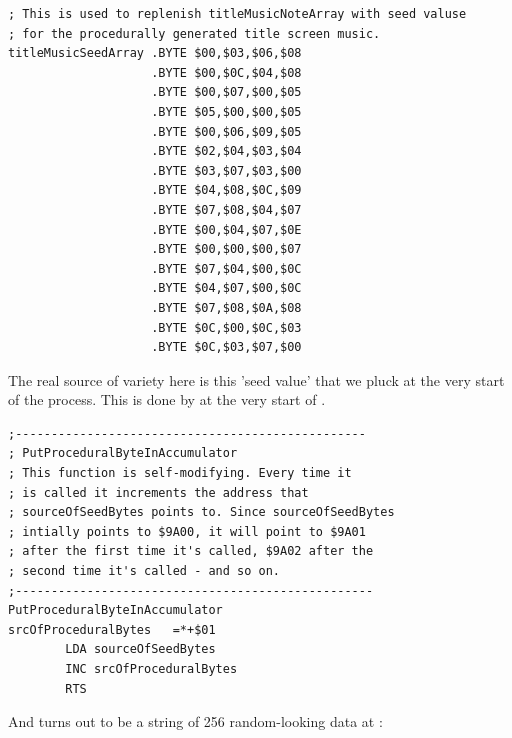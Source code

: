 \begin{lstlisting}[caption=Our seed bank for 4-byte sequences. It's 64 bytes long\, giving 16 possibles sequences in all.]
; This is used to replenish titleMusicNoteArray with seed valuse
; for the procedurally generated title screen music.
titleMusicSeedArray .BYTE $00,$03,$06,$08
                    .BYTE $00,$0C,$04,$08
                    .BYTE $00,$07,$00,$05
                    .BYTE $05,$00,$00,$05
                    .BYTE $00,$06,$09,$05
                    .BYTE $02,$04,$03,$04
                    .BYTE $03,$07,$03,$00
                    .BYTE $04,$08,$0C,$09
                    .BYTE $07,$08,$04,$07
                    .BYTE $00,$04,$07,$0E
                    .BYTE $00,$00,$00,$07
                    .BYTE $07,$04,$00,$0C
                    .BYTE $04,$07,$00,$0C
                    .BYTE $07,$08,$0A,$08
                    .BYTE $0C,$00,$0C,$03
                    .BYTE $0C,$03,$07,$00
\end{lstlisting}

The real source of variety here is this 'seed value' that we pluck at the very start of the process.
This is done by  at the very start of .

\begin{lstlisting}[caption= Our seed value ultimately comes from \icode{sourceOfSeedBytes}.]
;-------------------------------------------------
; PutProceduralByteInAccumulator
; This function is self-modifying. Every time it
; is called it increments the address that
; sourceOfSeedBytes points to. Since sourceOfSeedBytes
; intially points to $9A00, it will point to $9A01
; after the first time it's called, $9A02 after the
; second time it's called - and so on.
;--------------------------------------------------
PutProceduralByteInAccumulator
srcOfProceduralBytes   =*+$01
        LDA sourceOfSeedBytes
        INC srcOfProceduralBytes
        RTS
\end{lstlisting}

And  turns out to be a string of 256 random-looking data at :

